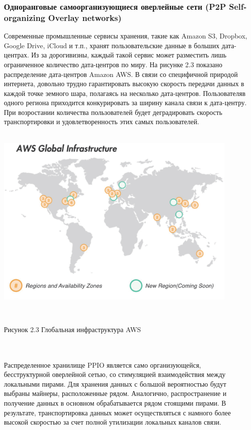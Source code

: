 \documentclass[10pt,a4paper]{article}
\begin{document}
\subsubsection{Одноранговые самоорганизующиеся оверлейные сети (P2P Self-organizing Overlay networks)}  %
         \vspace{-0.5em}
Современные промышленные сервисы хранения, такие как Amazon S3, Dropbox, Google Drive, iCloud и т.п., хранят пользовательские данные в больших дата-центрах. Из за дорогивизны, каждый такой сервис может разместить лишь ограниченное количество дата-центров по миру. На рисунке 2.3 показано распределение дата-центров Amazon AWS. В связи со специфичной природой интернета, довольно трудно гарантировать высокую скорость передачи данных в каждой точке земного шара, полагаясь на несколько дата-центров. Пользователяв одного региона приходится конкурировать за ширину канала связи к дата-центру. При возростании количества пользователей будет деградировать скорость транспортировки и удовлетворенность этих самых пользователей.
\vspace{-0.5em}
 \\ \\ \centerline{\includegraphics[width=340pt]{fig3}}
\\ \centerline{{Рисунок 2.3 Глобальная инфраструктура AWS}}
\\ \\ Распределенное хранилище PPIO является само организующейся, бесструктурной оверлейной сетью, со стимуляцией взаимодействия между локальными пирами. Для хранения данных с большой вероятностью будут выбраны майнеры, расположенные рядом. Аналогично, распространение и получение данных в основном обрабатывается рядом стоящими пирами. В результате, транспортировка данных может осуществляться с намного более высокой скоростью за счет полной утилизации локальных каналов связи.
\end{document}
